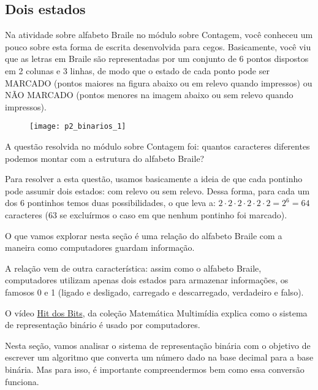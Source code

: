 \subsection{Dois estados}

Na atividade sobre alfabeto Braile no módulo sobre Contagem, você conheceu um pouco sobre esta forma de escrita desenvolvida para cegos. Basicamente, você viu que as letras em Braile são representadas por um conjunto de 6 pontos dispostos em 2 colunas e 3 linhas, de modo que o estado de cada ponto pode ser MARCADO (pontos maiores na figura abaixo ou em relevo quando impressos) ou NÃO MARCADO (pontos menores na imagem abaixo ou sem relevo quando impressos).

\begin{figure}[H]
\centering

\texttt{[image: p2\_binarios\_1]}
\end{figure}

A questão resolvida no módulo sobre Contagem foi: quantos caracteres diferentes podemos montar com a estrutura do alfabeto Braile?

Para resolver a esta questão, usamos basicamente a ideia de que cada pontinho pode assumir dois estados: com relevo ou sem relevo. Dessa forma, para cada um dos 6 pontinhos temos duas possibilidades, o que leva a: $2\cdot2\cdot2\cdot2\cdot2\cdot2=2^6=64$ caracteres ($63$ se excluírmos o caso em que nenhum pontinho foi marcado).

O que vamos explorar nesta seção é uma relação do alfabeto Braile com a maneira como computadores guardam informação.

A relação vem de outra característica: assim como o alfabeto Braile, computadores utilizam apenas dois estados para armazenar informações, os famosos 0 e 1 (ligado e desligado, carregado e descarregado, verdadeiro e falso).

\begin{research}
O vídeo \href{https://m3.ime.unicamp.br/recursos/1116}{Hit dos Bits}, da coleção Matemática Multimídia explica como o sistema de representação binário é usado por computadores.
\end{research}

Nesta seção, vamos analisar o sistema de representação binária com o objetivo de escrever um algoritmo que converta um número dado na base decimal para a base binária. Mas para isso, é importante compreendermos bem como essa conversão funciona.

